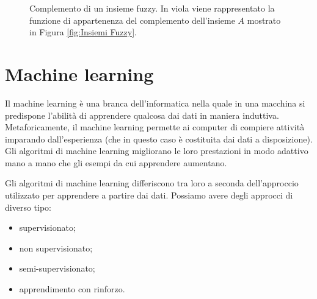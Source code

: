 \documentclass[a4paper,12pt]{report}
\begin{document}
\begin{figure}[ht]
    \centering
    \caption{Complemento di un insieme fuzzy. In viola viene rappresentato la funzione di appartenenza del complemento dell'insieme $A$ mostrato in Figura \ref{fig:Insiemi Fuzzy}.} 
    \label{fig:Complemento_insieme_fuzzy}  

\end{figure}


\section{Machine learning}
Il machine learning \cite{machine_learning_oreilly} è una branca dell'informatica nella quale in una macchina si predispone l'abilità di apprendere qualcosa dai dati in maniera induttiva.
Metaforicamente, il machine learning permette ai computer di compiere attività imparando dall'esperienza (che in questo caso è costituita dai dati a disposizione). \newline
Gli algoritmi di machine learning migliorano le loro prestazioni in modo adattivo mano a mano che gli esempi da cui apprendere aumentano.

\bigskip
Gli algoritmi di machine learning differiscono tra loro a seconda dell'approccio utilizzato per apprendere a partire dai dati.
Possiamo avere degli approcci di diverso tipo:
\begin{itemize}
    \item supervisionato;
    \item non supervisionato;
    \item semi-supervisionato;
    \item apprendimento con rinforzo.
\end{itemize}
\end{document}

